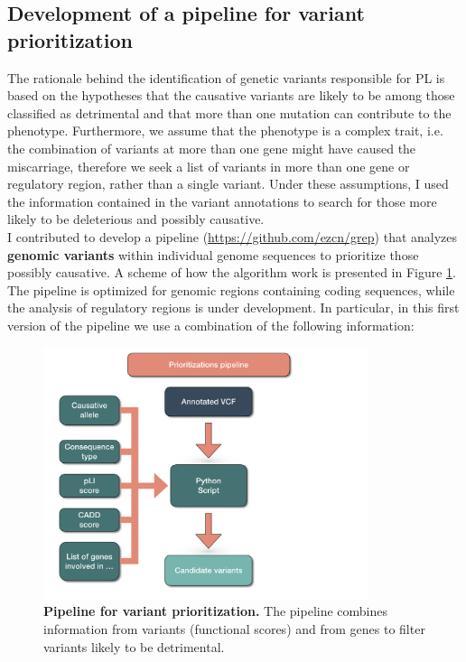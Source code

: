 \subsection{Development of a pipeline for variant prioritization}
The rationale behind the identification of genetic variants responsible for PL is based on the hypotheses that the causative variants are likely to be among those classified as detrimental and that more than one mutation can contribute to the phenotype. Furthermore, we assume that the phenotype is a complex trait, i.e. the combination of variants at more than one gene might have caused the miscarriage, therefore we seek a list of variants in more than one gene or regulatory region, rather than a single variant. Under these assumptions, I used the information contained in the variant annotations to search for those more likely to be deleterious and possibly causative.\\

I contributed to develop a pipeline (\url{https://github.com/ezcn/grep}) that analyzes \textbf{genomic variants} within individual genome sequences to prioritize those possibly causative. A scheme of how the algorithm work is presented in Figure \ref{fig:scriptPipeline}. The pipeline is optimized for genomic regions containing coding sequences, while the analysis of regulatory regions is under development. In particular, in this first version of the pipeline we use a combination of the following information: 

\begin{figure}[H]
\centering
\includegraphics[width=0.85\textwidth]{fig/scriptPipeline.png}
\decoRule
\caption{\textbf{Pipeline for variant prioritization.} The pipeline combines information from variants (functional scores) and from genes to filter variants likely to be detrimental.}
\label{fig:scriptPipeline}
\end{figure}

